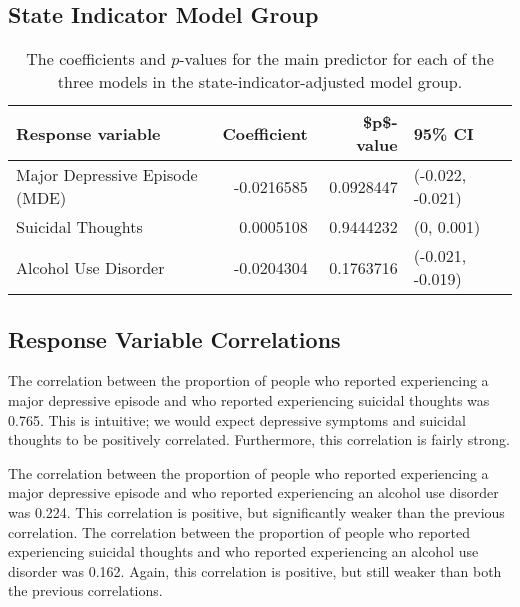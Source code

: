 \documentclass{article}
\begin{document}
\subsection{State Indicator Model Group}

\begin{table}[!htb]
\begin{center}
\begin{tabular}{l|r|r|l}
    \hline
    Response variable & Coefficient & \$p\$-value & 95\% CI\\
    \hline
    Major Depressive Episode (MDE) & -0.0216585 & 0.0928447 & (-0.022, -0.021)\\
    \hline
    Suicidal Thoughts & 0.0005108 & 0.9444232 & (0, 0.001)\\
    \hline
    Alcohol Use Disorder & -0.0204304 & 0.1763716 & (-0.021, -0.019)\\
    \hline
\end{tabular}
\caption{\label{tab:median-income-model-results} The coefficients and $p$-values
    for the main predictor for each of the three models
    in the state-indicator-adjusted model group.
}
\end{center}
\end{table}

\subsection{Response Variable Correlations}

The correlation between the proportion of people who reported experiencing
a major depressive episode and
who reported experiencing suicidal thoughts was
0.765.
This is intuitive; we would expect depressive symptoms and suicidal thoughts
to be positively correlated.
Furthermore, this correlation is fairly strong.

The correlation between the proportion of people who reported experiencing
a major depressive episode and
who reported experiencing an alcohol use disorder was
0.224.
This correlation is positive, but significantly weaker than
the previous correlation.
The correlation between the proportion of people who reported experiencing
suicidal thoughts and
who reported experiencing an alcohol use disorder was
0.162.
Again, this correlation is positive, but still weaker than
both the previous correlations.
\end{document}
